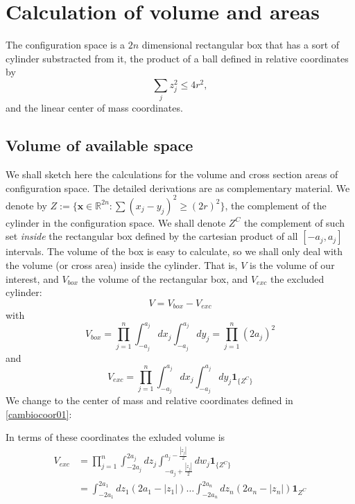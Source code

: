 \documentclass[superscriptaddress,pre,reprint,showpacs,twocolumn]{revtex4-1}
\newcommand{\indicatorsymbol}{\mathbf{1}}
\newcommand{\indicator}[1]{\indicatorsymbol_{ \{   #1 \} } }
\begin{document}
\section{Calculation of volume and areas}

The configuration space is a $2n$ dimensional rectangular box
that has a sort of cylinder substracted from it, the
product of a ball defined in relative coordinates by
\begin{equation}
  \sum_j z_j^2 \leq 4 r^2,
\end{equation}
and the linear center of mass coordinates.



\subsection{Volume of available space}

We shall sketch here the calculations for the volume and cross section areas
of configuration space. The detailed derivations are as complementary material.
We denote by $Z := \{ \mathbf{x} \in \mathbb{R}^{2n}: \sum (x_j-y_j)^2 \ge (2r)^2 \}$,
the complement of the cylinder in the configuration space.
We shall denote $Z^C$ the complement of such set \emph{inside} the rectangular
box defined by the cartesian product of all $[-a_j, a_j ]$ intervals.
The volume of the box is easy to calculate, so we shall only deal with
the volume (or cross area) inside the cylinder. That is, $V$ is the volume of
our interest, and $V_{box}$ the volume of the rectangular box, and $V_{exc}$ the
excluded cylinder:
\begin{equation}
V = V_{box} - V_{exc}
\end{equation}
with
\begin{equation}
V_{box} =  \prod_{j=1}^n \int_{-a_j}^{a_j} dx_j \int_{-a_j}^{a_j}  dy_j = \prod_{j=1}^n (2 a_j)^2 
\end{equation}
and
\begin{equation}
V_{exc} =  \prod_{j=1}^n \int_{-a_j}^{a_j} dx_j \int_{-a_j}^{a_j}  dy_j  \indicator{Z^C}
\end{equation}
We change to
the center of mass and relative coordinates defined in \eqref{cambiocoor01}:

In terms of these coordinates the exluded volume is 
\begin{align}
V_{exc} & =  \prod_{j=1}^n \int_{-2a_j}^{2a_j} dz_j \int_{-a_j + \frac{|z_j|}{2}}^{a_j - \frac{|z_j|}{2}}  dw_j  \indicator{Z^C} \\
& = \int_{-2a_1}^{2a_1} dz_1 (2a_1 -|z_1|)  \ldots \int_{-2a_n}^{2a_n} dz_n (2a_n - |z_n|)  \mathbf{1}_{Z^C} 
\end{align}
\end{document}
